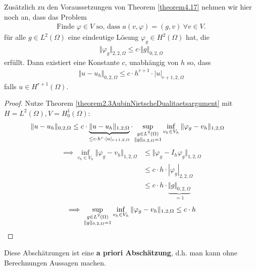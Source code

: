 \begin{theorem}\label{theorem4.18}
Zusätzlich zu den Voraussetzungen von Theorem \ref{theorem4.17} nehmen wir hier noch an, dass das Problem 
\begin{align*}
\text{Finde }\varphi\in V\text{ so, dass }a(v,\varphi)=(g,v)~\forall v\in V.
\end{align*}
für alle $g\in L^2(\Omega)$ eine eindeutige Lösung $\varphi_g\in H^2(\Omega)$ hat, die 
\begin{align*}
\Vert\varphi_g\Vert_{2,2,\Omega}\leq c\cdot\Vert g\Vert_{0,2,\Omega}
\end{align*}
erfüllt. Dann existiert eine Konstante $c$, unabhängig von $h$ so, dass
\begin{align*}
\Vert u-u_h\Vert_{0,2,\Omega}\leq c\cdot h^{r+1}\cdot|u|_{r+1,2,\Omega}
\end{align*}
falls $u\in H^{r+1}(\Omega)$.
\end{theorem}
\begin{proof}
Nutze Theorem \ref{theorem2.3AubinNietscheDualitaetsargument} mit $H=L^2(\Omega),V=H_0^1(\Omega)$:
\begin{align*} %
\Vert u-u_h\Vert_{0,2,\Omega}
&\leq c\cdot\underbrace{\Vert u-u_h\Vert_{1,2,\Omega}}_{\leq c \cdot h^r\cdot|u|_{r+1,2,\Omega}}\cdot\sup\limits_{\begin{subarray}{c}g\in L^2(\Omega)\\\Vert g\Vert_{0,2,\Omega}=1\end{subarray}}\inf\limits_{v_h\in V_h}\Vert\varphi_g-v_h\Vert_{1,2,\Omega}
\end{align*}
\begin{align*}
\implies
\inf\limits_{v_h\in V_h}\Vert\varphi_g-v_h\Vert_{1,2,\Omega}
&\leq\big\Vert\varphi_g -I_h\varphi_g\big\Vert_{1,2,\Omega}\\
&\leq c\cdot h\cdot|\varphi_g|_{2,2,\Omega}\\
&\leq c\cdot h\cdot\underbrace{\Vert g\Vert_{0,2,\Omega}}_{=1}
\end{align*}
\begin{align*}
\implies
\sup\limits_{\begin{subarray}{c}g\in L^2(\Omega)\\\Vert g\Vert_{0,2,\Omega}=1\end{subarray}}\inf\limits_{v_h\in V_h}\Vert\varphi_g-v_h\Vert_{1,2,\Omega}
\leq c\cdot h
\end{align*}
\end{proof}

Diese Abschätzungen ist eine \textbf{a priori Abschätzung}, d.h. man kann ohne Berechnungen Aussagen machen.

